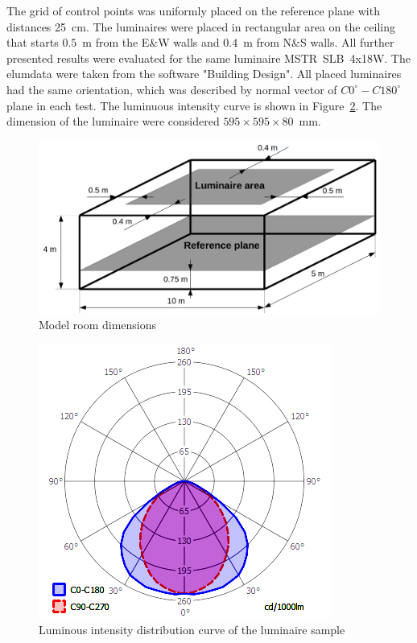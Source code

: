 The grid of control points was uniformly placed on the reference plane with distances 25~cm. The luminaires were placed in rectangular area on the ceiling that starts $0.5$~m from the E\&W walls and $0.4$~m from N\&S walls. All further presented results were evaluated for the same luminaire  MSTR~SLB~4x18W. The elumdata were taken from the software "Building Design". All placed luminaires had the same orientation, which was described by normal vector of $C0^\circ-C180^\circ$ plane in each test. The luminuous intensity curve is shown in Figure~\ref{fig:IDiag}. The dimension of the luminaire were considered $595\times 595\times 80$~mm.

\begin{figure}[htb]
  \centering
  \includegraphics[width=\columnwidth]{modRoom}
  \caption{Model room dimensions}
  \label{fig:modRoom}
\end{figure}

\begin{figure}[htb]
  \centering
  \includegraphics[width=0.8\columnwidth]{IDiag}
  \caption{Luminous intensity distribution curve of the luminaire sample}
  \label{fig:IDiag}
\end{figure}